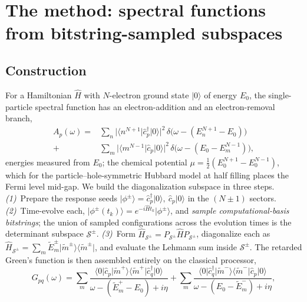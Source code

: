 \section{The method: spectral functions from bitstring-sampled subspaces}\label{sec:method}

\subsection{Construction}
For a Hamiltonian $\hat H$ with $N$-electron ground state $\lvert 0\rangle$ of energy $E_0$, the
single-particle spectral function has an electron-addition and an electron-removal branch,
\begin{equation}
\begin{aligned}
A_{p}(\omega)=&\sum_{n}\bigl|\langle n^{N+1}\lvert \hat c^\dagger_p\rvert 0\rangle\bigr|^{2}\,
\delta\!\bigl(\omega-(E^{N+1}_n-E_0)\bigr)\\
+&\sum_{m}\bigl|\langle m^{N-1}\lvert \hat c_p\rvert 0\rangle\bigr|^{2}\,
\delta\!\bigl(\omega-(E_0-E^{N-1}_m)\bigr),
\end{aligned}
\label{eq:lehmann}
\end{equation}
energies measured from $E_0$; the chemical potential $\mu=\tfrac12(E^{N+1}_0-E^{N-1}_0)$, which for the
particle--hole-symmetric Hubbard model at half filling places the Fermi level mid-gap. We build the
diagonalization subspace in three steps. \emph{(1)}~Prepare the response seeds
$\lvert\phi^{\pm}\rangle=\hat c^{\dagger}_p\lvert 0\rangle,\ \hat c_p\lvert 0\rangle$ in the
$(N{\pm}1)$ sectors. \emph{(2)}~Time-evolve each, $\lvert\phi^{\pm}(t_k)\rangle=e^{-i\hat H
t_k}\lvert\phi^{\pm}\rangle$, and \emph{sample computational-basis bitstrings}; the union of sampled
configurations across the evolution times is the determinant subspace $\mathcal S^{\pm}$.
\emph{(3)}~Form $\hat H_{\mathcal S^{\pm}}=P_{\mathcal S^{\pm}}\hat H P_{\mathcal S^{\pm}}$,
diagonalize each as $\hat H_{\mathcal S^{\pm}}=\sum_m \tilde E^{\pm}_m\lvert\tilde m^{\pm}\rangle\langle\tilde m^{\pm}\rvert$,
and evaluate the Lehmann sum inside $\mathcal S^{\pm}$. The retarded Green's function is then assembled
entirely on the classical processor,
\begin{equation}
G_{pq}(\omega)=\sum_{m}\frac{\langle 0\lvert \hat c_p\rvert\tilde m^{+}\rangle\langle\tilde m^{+}\lvert \hat
c^\dagger_q\rvert 0\rangle}{\omega-(\tilde E^{+}_m-E_0)+i\eta}
+\sum_{m}\frac{\langle 0\lvert \hat c^{\dagger}_q\rvert\tilde m^{-}\rangle\langle\tilde m^{-}\lvert \hat
c_p\rvert 0\rangle}{\omega-(E_0-\tilde E^{-}_m)+i\eta},
\label{eq:green}
\end{equation}
